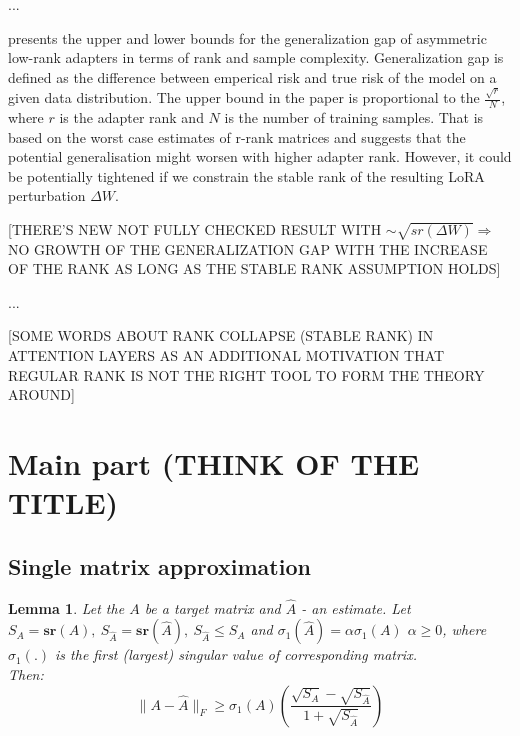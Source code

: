 \documentclass{article}
\newtheorem{lemma}{Lemma}
\begin{document}
        ...

        \cite{kratsios2025sharpgeneralizationboundsfoundation} presents the upper and lower bounds for the generalization gap of asymmetric low-rank adapters \cite{zhu2024asymmetry} in terms of rank and sample complexity. Generalization gap is defined as the difference between emperical risk and true risk of the model on a given data distribution. The upper bound in the paper is proportional to the $\frac{\sqrt{r}}{N}$, where $r$ is the adapter rank and $N$ is the number of training samples. That is based on the worst case estimates of r-rank matrices and suggests that the potential generalisation might worsen with higher adapter rank. However, it could be potentially tightened if we constrain the stable rank of the resulting LoRA perturbation $\Delta W$. 
        
        [THERE'S NEW NOT FULLY CHECKED RESULT WITH $\sim \sqrt{sr(\Delta W)} \Longrightarrow$ NO GROWTH OF THE GENERALIZATION GAP WITH THE INCREASE OF THE RANK AS LONG AS THE STABLE RANK ASSUMPTION HOLDS]


        ... 

        [SOME WORDS ABOUT RANK COLLAPSE (STABLE RANK) IN ATTENTION LAYERS \cite{saada2025mindgapspectralanalysis} AS AN ADDITIONAL MOTIVATION THAT REGULAR RANK IS NOT THE RIGHT TOOL TO FORM THE THEORY AROUND]
    
    \section{Main part (THINK OF THE TITLE)}
        \subsection{Single matrix approximation}

            \begin{lemma}
                Let the $A$ be a target matrix and $\hat{A}$ - an estimate. Let $S_A = \mathbf{sr}(A), ~S_{\hat{A}} = \mathbf{sr}(\hat{A}), ~S_{\hat{A}} \leqslant S_A$ and $\sigma_1(\hat{A}) =\alpha \sigma_1(A)$ $\alpha\geq 0$, where $\sigma_1(.)$ is the first (largest) singular value of corresponding matrix.\\
                Then: \[ 
                \|A - \hat{A}\|_F \geqslant \sigma_1(A)\left(\frac{\sqrt{S_A} - \sqrt{S_{\hat{A}}}}{1 + \sqrt{S_{\hat{A}}}}\right)
                \]
            \end{lemma}
\end{document}
